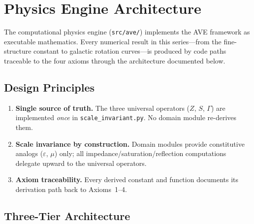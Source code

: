 %

\chapter{Physics Engine Architecture}
\label{ch:engine_architecture}

The computational physics engine (\texttt{src/ave/}) implements
the AVE framework as executable mathematics.  Every numerical
result in this series---from the fine-structure constant to galactic
rotation curves---is produced by code paths traceable to the four
axioms through the architecture documented below.

\section{Design Principles}

\begin{enumerate}
    \item \textbf{Single source of truth.}  The three universal operators
          ($Z$, $S$, $\Gamma$) are implemented \emph{once} in
          \texttt{scale\_invariant.py}.  No domain module re-derives them.
    \item \textbf{Scale invariance by construction.}  Domain modules
          provide constitutive analogs ($\varepsilon$, $\mu$) only;
          all impedance/saturation/reflection computations delegate
          upward to the universal operators.
    \item \textbf{Axiom traceability.}  Every derived constant and
          function documents its derivation path back to Axioms~1--4.
\end{enumerate}


\section{Three-Tier Architecture}

